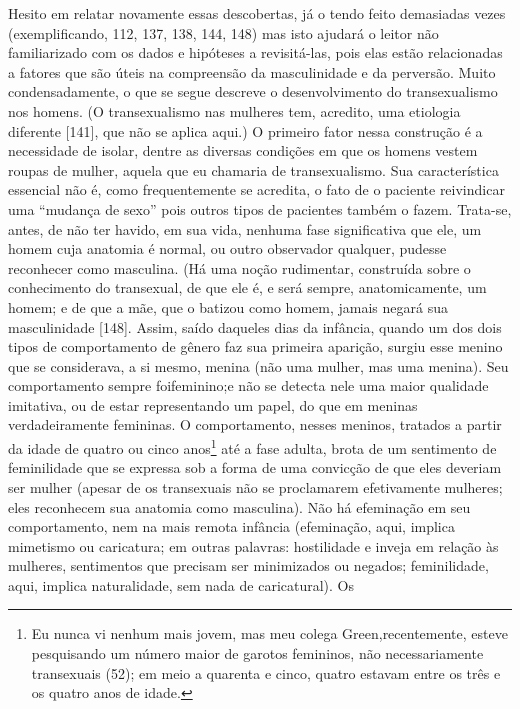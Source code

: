 Hesito em relatar novamente essas descobertas, já o tendo feito
demasiadas vezes (exemplificando, 112, 137, 138, 144, 148) mas isto
ajudará o leitor não familiarizado com os dados e hipóteses a
revisitá-las, pois elas estão relacionadas a fatores que são úteis na
compreensão da masculinidade e da perversão. Muito condensadamente, o
que se segue descreve o desenvolvimento do transexualismo nos homens.
(O transexualismo nas mulheres tem, acredito, uma etiologia diferente
[141], que não se aplica aqui.) O primeiro fator nessa construção é a
necessidade de isolar, dentre as diversas condições em que os homens
vestem roupas de mulher, aquela que eu chamaria de transexualismo. Sua
característica essencial não é, como frequentemente se acredita, o fato
de o paciente reivindicar uma ``mudança de
sexo'' pois outros tipos de pacientes também o fazem.
Trata-se, antes, de não ter havido, em sua vida, nenhuma fase
significativa que ele, um homem cuja anatomia é normal, ou outro
observador qualquer, pudesse reconhecer como masculina. (Há uma noção
rudimentar, construída sobre o conhecimento do transexual, de que ele
é, e será sempre, anatomicamente, um homem; e de que a mãe, que o
batizou como homem, jamais negará sua masculinidade [148]. Assim, saído
daqueles dias da infância, quando um dos dois tipos de comportamento de
gênero faz sua primeira aparição, surgiu esse menino que se
considerava, a si mesmo, menina (não uma mulher, mas uma menina). Seu
comportamento sempre foi\idxhomosafem[|(] feminino;\idxidenefe[|(] e não se detecta nele uma maior
qualidade imitativa, ou de estar representando um papel, do que em
meninas verdadeiramente femininas. O comportamento, nesses meninos,
tratados a partir da idade de quatro ou cinco anos\footnote{ Eu nunca
vi nenhum mais jovem, mas meu colega Green,\idxgreen[|nn] recentemente, esteve
pesquisando um número maior de garotos femininos, não necessariamente
transexuais (52); em meio a quarenta e cinco, quatro estavam entre os
três e os quatro anos de idade.} até a fase adulta, brota de um
sentimento de feminilidade que se expressa sob a forma de uma convicção
de que eles deveriam ser mulher (apesar de os transexuais não se
proclamarem efetivamente mulheres; eles reconhecem sua anatomia como
masculina). Não há efeminação em seu comportamento, nem na mais
remota infância (efeminação, aqui, implica mimetismo ou caricatura; em
outras palavras: hostilidade e inveja em relação às mulheres,
sentimentos que precisam ser minimizados ou negados; feminilidade,
aqui, implica naturalidade, sem nada de caricatural). Os            %
